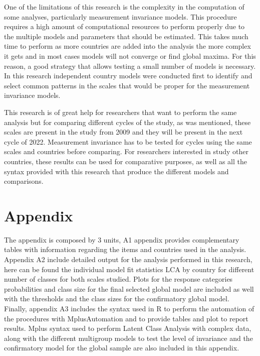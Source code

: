 \documentclass[12pt,a4paper,oneside]{reedthesis}
\begin{document}
One of the limitations of this research is the complexity in the computation of some analyses, particularly measurement invariance models. This procedure requires a high amount of computational resources to perform properly due to the multiple models and parameters that should be estimated. This takes much time to perform as more countries are added into the analysis the more complex it gets and in most cases models will not converge or find global maxima. For this reason, a good strategy that allows testing a small number of models is necessary. In this research independent country models were conducted first to identify and select common patterns in the scales that would be proper for the measurement invariance models.

This research is of great help for researchers that want to perform the same analysis but for comparing different cycles of the study, as was mentioned, these scales are present in the study from 2009 and they will be present in the next cycle of 2022. Measurement invariance has to be tested for cycles using the same scales and countries before comparing. For researchers interested in study other countries, these results can be used for comparative purposes, as well as all the syntax provided with this research that produce the different models and comparisons.

\appendix

\hypertarget{appendix}{%
\chapter{Appendix}\label{appendix}}

The appendix is composed by 3 units, A1 appendix provides complementary tables with information regarding the items and countries used in the analysis.\\
Appendix A2 include detailed output for the analysis performed in this research, here can be found the individual model fit statistics LCA by country for different number of classes for both scales studied. Plots for the response categories probabilities and class size for the final selected global model are included as well with the thresholds and the class sizes for the confirmatory global model.\\
Finally, appendix A3 includes the syntax used in R to perform the automation of the procedures with MplusAutomation and to provide tables and plot to report results. Mplus syntax used to perform Latent Class Analysis with complex data, along with the different multigroup models to test the level of invariance and the confirmatory model for the global sample are also included in this appendix.
\end{document}
